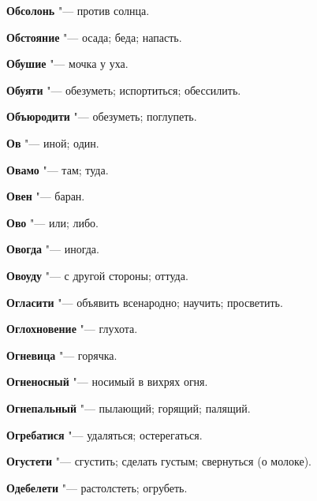 \begin{mymulticols}{2}
\noindent\textbf{Обсолонь} "--- против солнца. 




\noindent\textbf{Обстояние} "--- осада; беда; напасть. 




\noindent\textbf{Обушие} "--- мочка у уха. 




\noindent\textbf{Обуяти} "--- обезуметь; испортиться; обессилить. 




\noindent\textbf{Объюродити} "--- обезуметь; поглупеть. 




\noindent\textbf{Ов} "--- иной; один. 




\noindent\textbf{Овамо} "--- там; туда. 




\noindent\textbf{Овен} "--- баран. 




\noindent\textbf{Ово} "--- или; либо. 




\noindent\textbf{Овогда} "--- иногда. 




\noindent\textbf{Овоуду} "--- с другой стороны; оттуда. 




\noindent\textbf{Огласити} "--- объявить всенародно; научить; просветить. 




\noindent\textbf{Оглохновение} "--- глухота. 




\noindent\textbf{Огневица} "--- горячка. 




\noindent\textbf{Огненосный} "--- носимый в вихрях огня. 




\noindent\textbf{Огнепальный} "--- пылающий; горящий; палящий. 




\noindent\textbf{Огребатися} "--- удаляться; остерегаться. 




\noindent\textbf{Огустети} "--- сгустить; сделать густым; свернуться (о молоке). 




\noindent\textbf{Одебелети} "--- растолстеть; огрубеть. 





\end{mymulticols}

